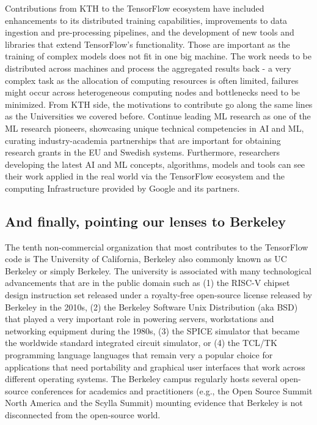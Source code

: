 \documentclass[CHICAGO,Times1COL]{WileyNJDv5} %
\begin{document}
Contributions from KTH  to the TensorFlow ecosystem have included enhancements to its distributed training capabilities, improvements to data ingestion and pre-processing pipelines, and the development of new tools and libraries that extend TensorFlow's functionality. Those are important as the training of complex models does not fit in one big machine. The work needs to be distributed across machines and process the aggregated results back - a very complex task as the allocation of computing resources is often limited, failures might occur across heterogeneous computing nodes and bottlenecks need to be minimized. 
From KTH side, the motivations to contribute go along the same lines as the Universities we covered before. Continue leading \ac{ML} research as one of the \ac{ML} research pioneers, showcasing unique technical competencies in \ac{AI} and \ac{ML}, curating industry-academia partnerships that are important for obtaining research grants in the EU and Swedish systems.  Furthermore, researchers developing the latest \ac{AI} and \ac{ML} concepts, algorithms, models and tools can see their work applied in the real world via the TensorFlow ecosystem and the computing Infrastructure provided by Google and its partners.  










\subsection{And finally, pointing our lenses to Berkeley}

The tenth non-commercial organization that most contributes to the TensorFlow code is The University of California, Berkeley also commonly known as UC Berkeley or simply Berkeley.  The university is associated with many technological advancements that are in the public domain such as (1) the RISC-V chipset design instruction set released under a royalty-free open-source license released by Berkeley in the 2010s, (2) the Berkeley Software Unix Distribution (aka BSD) that played a very important role in powering servers, workstations and networking equipment during the 1980s, (3) the SPICE simulator that became the worldwide standard integrated circuit simulator, or (4) the TCL/TK programming language languages that remain very a popular choice for applications that need portability and graphical user interfaces that work across different operating systems.  The Berkeley campus regularly hosts several open-source conferences for academics and practitioners (e.g., the Open Source Summit North America and the Scylla Summit) mounting evidence that Berkeley is not disconnected from the open-source world. 
\end{document}
